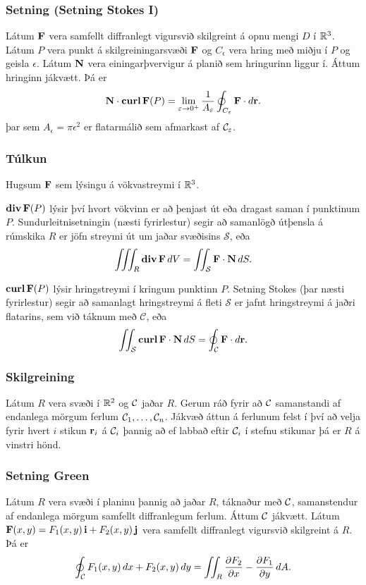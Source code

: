 \subsubsection{Setning  \rtask{} (Setning Stokes I)}
  Látum $\Fv$ vera samfellt
diffranlegt vigursvið skilgreint á opnu mengi $D$ í $\R^3$.    Látum
$P$ vera punkt á skilgreiningarsvæði $\Fv$ og $C_\epsilon$ vera
hring með miðju í $P$ og geisla $\epsilon$.  Látum $\Nv$ vera
einingarþvervigur á planið sem hringurinn liggur í.  Áttum hringinn
jákvætt.
Þá er
$$\Nv\cdot\curl \Fv(P)=\lim_{\epsilon\rightarrow 0^+}
\frac{1}{A_\epsilon}\oint_{C_\epsilon}\Fv\cdot d\rv.$$
 þar sem $A_\epsilon = \pi\epsilon^2$ er flatarmálið sem afmarkast af  ${\cal C}_\epsilon$.



\subsubsection{Túlkun \rtask{}}
 Hugsum $\Fv$ sem lýsingu á vökvastreymi í $\R^3$.

$\dive \Fv(P)$ lýsir því hvort vökvinn er að þenjast út eða dragast
saman í punktinum $P$.  Sundurleitnisetningin (næsti fyrirlestur)
segir að samanlögð útþensla á rúmskika $R$ er jöfn streymi út um jaðar svæðisins $\mathcal{S}$,
eða 
$$\thrint_R\dive\Fv\,dV=\tvint_{\mathcal{S}} \Fv\cdot\Nv\,dS.$$

$\curl \Fv(P)$ lýsir hringstreymi í kringum punktinn $P$.  Setning
Stokes (þar næsti fyrirlestur) segir að samanlagt hringstreymi á fleti $\mathcal{S}$
er jafnt hringstreymi á jaðri flatarins, sem við táknum með $\mathcal{C}$, eða
$$\tvint_{\cal S} \curl\Fv\cdot\Nv\,dS=\oint_\mathcal{C} \Fv\cdot d\rv.$$



\subsubsection{Skilgreining \rtask{}}
 Látum $R$ vera svæði í $\R^2$ og $\cal C$
jaðar $R$.  Gerum ráð fyrir að $\cal C$ samanstandi af endanlega
mörgum ferlum ${\cal C}_1, \ldots, {\cal C}_n$.  Jákvæð áttun á
ferlunum felst í því að velja fyrir hvert $i$ stikun $\rv_i$ á ${\cal
  C}_i$ þannig að ef labbað eftir ${\cal C}_i$ í stefnu stikunar þá er
$R$ á vinstri hönd.




\subsubsection{Setning Green \rtask{}}
  Látum $R$ vera svæði í planinu þannig að
jaðar $R$, táknaður með $\cal C$,  
samanstendur af endanlega mörgum samfellt diffranlegum
ferlum.  Áttum $\cal C$ jákvætt.  Látum
$\Fv(x,y)=F_1(x,y)\,\iv+F_2(x,y)\,\jv$ vera samfellt diffranlegt
vigursvið skilgreint á $R$.  Þá er 
$$\oint_{\cal C}F_1(x,y)\,dx+F_2(x,y)\,dy=\tvint_R
\frac{\partial  F_2}{\partial x}- 
\frac{\partial  F_1}{\partial y}\,dA.$$



